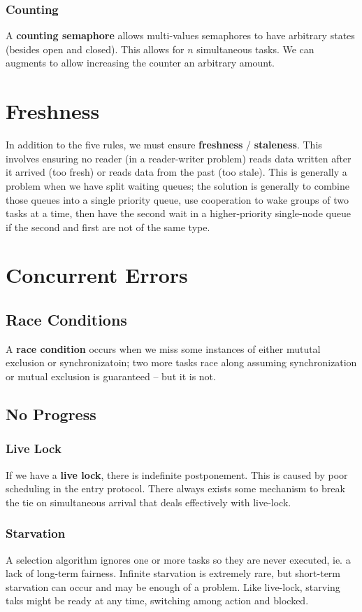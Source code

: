 \documentclass[12pt]{article}
\begin{document}
\subsubsection{Counting}
A {\bf counting semaphore} allows multi-values semaphores to have arbitrary states (besides open and closed). This allows for $n$ simultaneous tasks. We can augments  to allow increasing the counter an arbitrary amount.

\section{Freshness}
In addition to the five rules, we must ensure {\bf freshness} / {\bf staleness}. This involves ensuring no reader (in a reader-writer problem) reads data written after it arrived (too fresh) or reads data from the past (too stale). This is generally a problem when we have split waiting queues; the solution is generally to combine those queues into a single priority queue, use cooperation to wake groups of two tasks at a time, then have the second wait in a higher-priority single-node queue if the second and first are not of the same type.

\section{Concurrent Errors}
\subsection{Race Conditions}
A {\bf race condition} occurs when we miss some instances of either mututal exclusion or synchronizatoin; two more tasks race along assuming synchronization or mutual exclusion is guaranteed -- but it is not.

\subsection{No Progress}
\subsubsection{Live Lock}
If we have a {\bf live lock}, there is indefinite postponement. This is caused by poor scheduling in the entry protocol. There always exists some mechanism to break the tie on simultaneous arrival that deals effectively with live-lock.

\subsubsection{Starvation}
A selection algorithm ignores one or more tasks so they are never executed, ie. a lack of long-term fairness. Infinite starvation is extremely rare, but short-term starvation can occur and may be enough of a problem. Like live-lock, starving taks might be ready at any time, switching among action and blocked.
\end{document}
